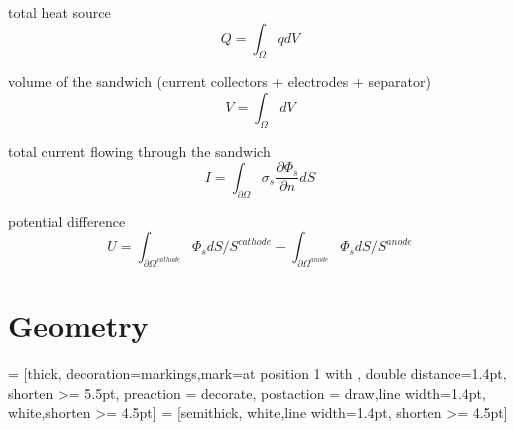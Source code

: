 \documentclass[10pt, oneside]{article}   	%
\begin{document}
total heat source
\begin{equation}
Q = \int_\Omega q dV
\end{equation}

volume of the sandwich (current collectors + electrodes + separator)
\begin{equation}
V = \int_\Omega dV
\end{equation}

total current flowing through the sandwich
\begin{equation}
I = \int_{\partial\Omega} \sigma_s \frac{\partial \Phi_s}{\partial n} dS
\end{equation}

potential difference 
\begin{equation}
U = \int_{\partial\Omega^{cathode}} \Phi_s dS / S^{cathode} 
- \int_{\partial\Omega^{anode}} \Phi_s dS / S^{anode}
\end{equation}





\section{Geometry}

 = [thick, decoration={markings,mark=at position
   1 with {}},
   double distance=1.4pt, shorten >= 5.5pt,
   preaction = {decorate},
   postaction = {draw,line width=1.4pt, white,shorten >= 4.5pt}]
 = [semithick, white,line width=1.4pt, shorten >= 4.5pt]
\end{document}

